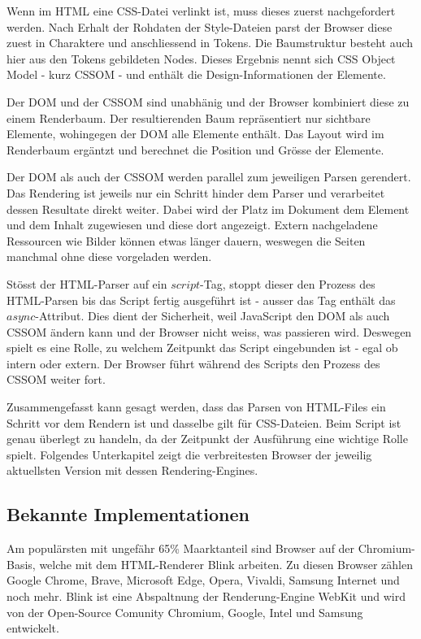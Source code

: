 Wenn im HTML eine CSS-Datei verlinkt ist, muss dieses zuerst nachgefordert werden.
Nach Erhalt der Rohdaten der Style-Dateien parst der Browser diese zuest in Charaktere und anschliessend in Tokens.
Die Baumstruktur besteht auch hier aus den Tokens gebildeten Nodes. 
Dieses Ergebnis nennt sich CSS Object Model - kurz CSSOM - und enthält die Design-Informationen der Elemente.

Der DOM und der CSSOM sind unabhänig und der Browser kombiniert diese zu einem Renderbaum.
Der resultierenden Baum repräsentiert nur sichtbare Elemente, wohingegen der DOM alle Elemente enthält.
Das Layout wird im Renderbaum ergäntzt und berechnet die Position und Grösse der Elemente.

Der DOM als auch der CSSOM werden parallel zum jeweiligen Parsen gerendert.
Das Rendering ist jeweils nur ein Schritt hinder dem Parser und verarbeitet dessen Resultate direkt weiter.
Dabei wird der Platz im Dokument dem Element und dem Inhalt zugewiesen und diese dort angezeigt.
Extern nachgeladene Ressourcen wie Bilder können etwas länger dauern, weswegen die Seiten manchmal ohne diese vorgeladen werden.

Stösst der HTML-Parser auf ein $script$-Tag, stoppt dieser den Prozess des HTML-Parsen bis das Script fertig ausgeführt ist - ausser das Tag enthält das $async$-Attribut.
Dies dient der Sicherheit, weil JavaScript den DOM als auch CSSOM ändern kann und der Browser nicht weiss, was passieren wird.
Deswegen spielt es eine Rolle, zu welchem Zeitpunkt das Script eingebunden ist - egal ob intern oder extern. 
Der Browser führt während des Scripts den Prozess des CSSOM weiter fort.

Zusammengefasst kann gesagt werden, dass das Parsen von HTML-Files ein Schritt vor dem Rendern ist und dasselbe gilt für CSS-Dateien. 
Beim Script ist genau überlegt zu handeln, da der Zeitpunkt der Ausführung eine wichtige Rolle spielt.
Folgendes Unterkapitel zeigt die verbreitesten Browser der jeweilig aktuellsten Version mit dessen Rendering-Engines.


\subsection{Bekannte Implementationen}

Am populärsten mit ungefähr 65\% Maarktanteil sind Browser auf der Chromium-Basis, welche mit dem HTML-Renderer Blink arbeiten. 
Zu diesen Browser zählen Google Chrome, Brave, Microsoft Edge, Opera, Vivaldi, Samsung Internet und noch mehr.
Blink ist eine Abspaltnung der Renderung-Engine WebKit und wird von der Open-Source Comunity Chromium, Google, Intel und Samsung entwickelt.

